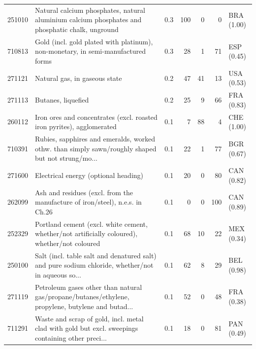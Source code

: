 \begin{tabular}{@{}l p{6.4cm} r r r r l@{}}
251010 & Natural calcium phosphates, natural aluminium calcium phosphates and phosphatic chalk, unground & 0.3 & 100 & 0 & 0 & BRA (1.00) \\
710813 & Gold (incl. gold plated with platinum), non-monetary, in semi-manufactured forms & 0.3 & 28 & 1 & 71 & ESP (0.45) \\
271121 & Natural gas, in gaseous state & 0.2 & 47 & 41 & 13 & USA (0.53) \\
271113 & Butanes, liquefied & 0.2 & 25 & 9 & 66 & FRA (0.83) \\
260112 & Iron ores and concentrates (excl. roasted iron pyrites), agglomerated & 0.1 & 7 & 88 & 4 & CHE (1.00) \\
710391 & Rubies, sapphires and emeralds, worked othw. than simply sawn/\allowbreak{}roughly shaped but not strung/\allowbreak{}mo... & 0.1 & 22 & 1 & 77 & BGR (0.67) \\
271600 & Electrical energy (optional heading) & 0.1 & 20 & 0 & 80 & CAN (0.82) \\
262099 & Ash and residues (excl. from the manufacture of iron/\allowbreak{}steel), n.e.s. in Ch.26 & 0.1 & 0 & 0 & 100 & CAN (0.89) \\
252329 & Portland cement (excl. white cement, whether/\allowbreak{}not artificially coloured), whether/\allowbreak{}not coloured & 0.1 & 68 & 10 & 22 & MEX (0.34) \\
250100 & Salt (incl. table salt and denatured salt) and pure sodium chloride, whether/\allowbreak{}not in aqueous so... & 0.1 & 62 & 8 & 29 & BEL (0.98) \\
271119 & Petroleum gases other than natural gas/\allowbreak{}propane/\allowbreak{}butanes/\allowbreak{}ethylene, propylene, butylene and butad... & 0.1 & 52 & 0 & 48 & FRA (0.38) \\
711291 & Waste and scrap of gold, incl. metal clad with gold but excl. sweepings containing other preci... & 0.1 & 18 & 0 & 81 & PAN (0.49) \\
\bottomrule
\end{tabular}
